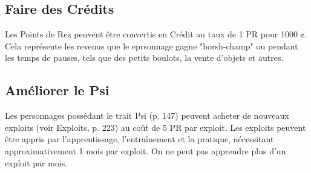 \subsection{Faire des Crédits} \label{sec:making-credit} 

Les Points de Rez peuvent être convertis en Crédit au taux de 1 PR pour 1000 ¢. Cela représente les revenus que le eprsonnage gagne "horsh-champ" ou pendant les temps de pauses, tels que des petits boulots, la vente d'objets et autres. 

\subsection{Améliorer le Psi} \label{sec:improving-psi} 

Les personnages possédant le trait Psi (p. 147) peuvent acheter de nouveaux exploits (voir Exploits, p. 223) au coût de 5 PR par exploit. Les exploits peuvent être appris par l'apprentissage, l'entraînement et la pratique, nécessitant approximativement 1 mois par exploit. On ne peut pas apprendre plus d'un exploit par mois. 







